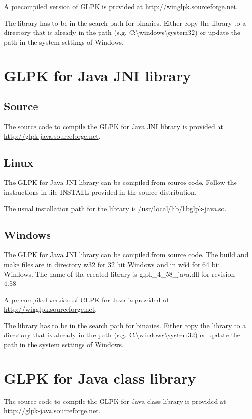 \documentclass[a4paper,11pt]{report}
\newcommand{\glpkVersionMajor}{4}
\newcommand{\glpkVersionMinor}{58}
\begin{document}
A precompiled version of GLPK is provided at \href{http://winglpk.sourceforge.net}{http://winglpk.sourceforge.net}.

The library has to be in the search path for binaries. Either copy the library to a directory that is already in the path (e.g. C:\textbackslash windows\textbackslash system32) or update the path in the system settings of Windows.

\section{GLPK for Java JNI library}
\subsection{Source}
The source code to compile the GLPK for Java JNI library is provided at \linebreak\href{http://glpk-java.sourceforge.net}{http://glpk-java.sourceforge.net}.

\subsection{Linux}
The GLPK for Java JNI library can be compiled from source code. Follow the instructions in file INSTALL provided in the source distribution.

The usual installation path for the library is /usr/local/lib/libglpk-java.so.
\subsection{Windows}
The GLPK for Java JNI library can be compiled from source code. The build and make files are in directory w32 for 32 bit Windows and in w64 for 64 bit Windows. The name of the created library is glpk\_\glpkVersionMajor\_\glpkVersionMinor\_java.dll for revision \glpkVersionMajor.\glpkVersionMinor.

A precompiled version of GLPK for Java is provided at \linebreak\href{http://winglpk.sourceforge.net}{http://winglpk.sourceforge.net}.

The library has to be in the search path for binaries. Either copy the library to a directory that is already in the path (e.g. C:\textbackslash windows\textbackslash system32) or update the path in the system settings of Windows.

\section{GLPK for Java class library}
The source code to compile the GLPK for Java class library is provided at \linebreak\href{http://glpk-java.sourceforge.net}{http://glpk-java.sourceforge.net}.
\end{document}
